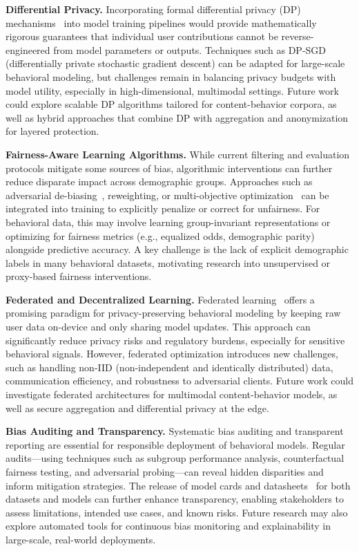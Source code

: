 \textbf{Differential Privacy.} Incorporating formal differential privacy (DP) mechanisms~\cite{dwork2014algorithmic} into model training pipelines would provide mathematically rigorous guarantees that individual user contributions cannot be reverse-engineered from model parameters or outputs. Techniques such as DP-SGD (differentially private stochastic gradient descent) can be adapted for large-scale behavioral modeling, but challenges remain in balancing privacy budgets with model utility, especially in high-dimensional, multimodal settings. Future work could explore scalable DP algorithms tailored for content-behavior corpora, as well as hybrid approaches that combine DP with aggregation and anonymization for layered protection.

\textbf{Fairness-Aware Learning Algorithms.} While current filtering and evaluation protocols mitigate some sources of bias, algorithmic interventions can further reduce disparate impact across demographic groups. Approaches such as adversarial de-biasing~\cite{zhang2018mitigating}, reweighting, or multi-objective optimization~\cite{hardt2016equality} can be integrated into training to explicitly penalize or correct for unfairness. For behavioral data, this may involve learning group-invariant representations or optimizing for fairness metrics (e.g., equalized odds, demographic parity) alongside predictive accuracy. A key challenge is the lack of explicit demographic labels in many behavioral datasets, motivating research into unsupervised or proxy-based fairness interventions.

\textbf{Federated and Decentralized Learning.} Federated learning~\cite{mcmahan2017communication} offers a promising paradigm for privacy-preserving behavioral modeling by keeping raw user data on-device and only sharing model updates. This approach can significantly reduce privacy risks and regulatory burdens, especially for sensitive behavioral signals. However, federated optimization introduces new challenges, such as handling non-IID (non-independent and identically distributed) data, communication efficiency, and robustness to adversarial clients. Future work could investigate federated architectures for multimodal content-behavior models, as well as secure aggregation and differential privacy at the edge.

\textbf{Bias Auditing and Transparency.} Systematic bias auditing and transparent reporting are essential for responsible deployment of behavioral models. Regular audits—using techniques such as subgroup performance analysis, counterfactual fairness testing, and adversarial probing—can reveal hidden disparities and inform mitigation strategies. The release of model cards and datasheets~\cite{mitchell2019model} for both datasets and models can further enhance transparency, enabling stakeholders to assess limitations, intended use cases, and known risks. Future research may also explore automated tools for continuous bias monitoring and explainability in large-scale, real-world deployments.

